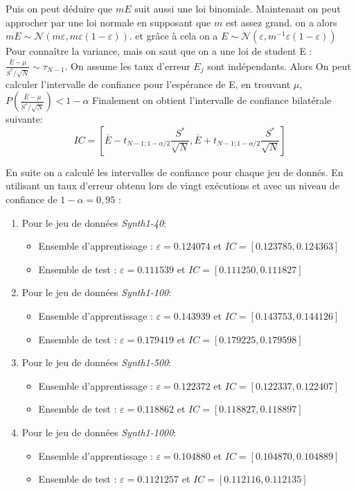 \documentclass[a4paper,11pt]{article}
\begin{document}
Puis on peut déduire que $mE$ suit aussi une loi binomiale. Maintenant on peut approcher par une loi normale en supposant que $m$ est assez grand. on a alors $mE\sim \mathcal{N}(m\varepsilon,m\varepsilon(1-\varepsilon))$.
et grâce à cela on a $E\sim \mathcal{N}(\varepsilon,m^{-1}\varepsilon(1-\varepsilon))$
Pour connaître la variance, mais on saut que on a une loi de student E : $\frac{\bar{E}-\mu}{S^*/\sqrt{N}} \sim \tau_{N-1}$. On assume les taux d'erreur $E_j$ sont indépendants. Alors On peut calculer l'intervalle de confiance pour l'espérance de E, en trouvant $\mu$,  $P(\frac{\bar{E}-\mu}{S^*/\sqrt{N}}) < 1-\alpha$
Finalement on obtient l’intervalle de confiance bilatérale suivante:
\[IC = [\bar{E} - t_{N-1;1-\alpha/2}\frac{S^*}{\sqrt{N}}, \bar{E} + t_{N-1;1-\alpha/2}\frac{S^*}{\sqrt{N}}]\]

En suite on a calculé les intervalles de confiance pour chaque jeu de donnés. En utilisant un taux d'erreur obtenu lors de vingt exécutions et avec un niveau de confiance de $1 - \alpha = 0,95$ : 
\begin{enumerate}
  \item Pour le jeu de données \textit{Synth1-40}:
  \begin{itemize}
    \item Ensemble d’apprentissage :  $\varepsilon = 0.124074$ et $IC = [0.123785,0.124363]$
    \item Ensemble de test :  $\varepsilon = 0.111539$ et $IC = [0.111250,0.111827]$
  \end{itemize}
  \item Pour le jeu de données \textit{Synth1-100}:
  \begin{itemize}
    \item Ensemble d’apprentissage :  $\varepsilon = 0.143939$ et $IC = [0.143753,0.144126]$
    \item Ensemble de test :  $\varepsilon = 0.179419$ et $IC = [0.179225,0.179598]$
  \end{itemize}
  \item Pour le jeu de données \textit{Synth1-500}:
  \begin{itemize}
    \item Ensemble d’apprentissage :  $\varepsilon = 0.122372$ et $IC = [0.122337,0.122407]$
    \item Ensemble de test :  $\varepsilon = 0.118862$ et $IC = [0.118827,0.118897]$
  \end{itemize}
  \item Pour le jeu de données \textit{Synth1-1000}:
  \begin{itemize}
    \item Ensemble d’apprentissage :  $\varepsilon = 0.104880$ et $IC = [0.104870,0.104889]$
    \item Ensemble de test :  $\varepsilon = 0.1121257$ et $IC = [0.112116,0.112135]$
  \end{itemize}
\end{enumerate}
\end{document}
